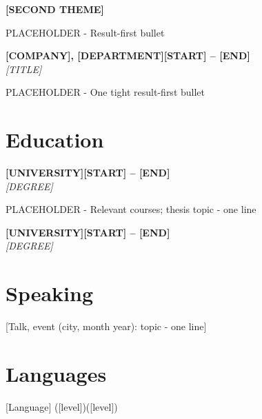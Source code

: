 \documentclass[a4paper,10pt]{article}
\newcommand{\sep}{\unskip\enspace\textperiodcentered\enspace\ignorespaces} %
\newcommand{\entry}[3]{
  \textbf{#1}\hfill\textbf{#2}\\
  \textit{#3}\par
}
\newcommand{\subgroup}[1]{
  \vspace{2pt}
  {\small\bfseries\color{accentText}#1}\par
}
\newenvironment{resume_list}{
  \vspace{-1pt}
  \begin{itemize}[itemsep=2pt, parsep=1pt, topsep=1pt, leftmargin=14pt, labelsep=6pt]
}{
  \end{itemize}
  \vspace{2pt}
}
\begin{document}
  \subgroup{[SECOND THEME]}
  \begin{resume_list}
    \item PLACEHOLDER - Result-first bullet
  \end{resume_list}

  \entry{[COMPANY], [DEPARTMENT]}{[START] -- [END]}{[TITLE]}
  \begin{resume_list}
    \item PLACEHOLDER - One tight result-first bullet
  \end{resume_list}


  \section{Education}

  \entry{[UNIVERSITY]}{[START] -- [END]}{[DEGREE]}
  \begin{resume_list}
    \item PLACEHOLDER - Relevant courses; thesis topic - one line
  \end{resume_list}

  \entry{[UNIVERSITY]}{[START] -- [END]}{[DEGREE]}


  \section{Speaking}
  [Talk, event (city, month year): topic - one line]


  \section{Languages}
  [Language] ([level])\sep [Language] ([level])
\end{document}
